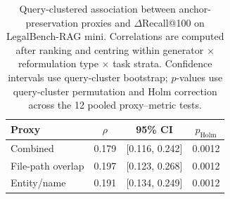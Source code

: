 \begin{table}[t]
\centering
\caption{Query-clustered association between anchor-preservation proxies
and $\Delta$Recall@100 on LegalBench-RAG mini. Correlations are computed
after ranking and centring within generator $\times$ reformulation type
$\times$ task strata. Confidence intervals use query-cluster bootstrap;
$p$-values use query-cluster permutation and Holm correction across the
12 pooled proxy--metric tests.}
\label{tab:anchor-proxy-correlation}
\begin{tabular}{lccc}
\toprule
Proxy & $\rho$ & 95\% CI & $p_{\mathrm{Holm}}$ \\
\midrule
Combined & 0.179 & [0.116, 0.242] & 0.0012 \\
File-path overlap & 0.197 & [0.123, 0.268] & 0.0012 \\
Entity/name & 0.191 & [0.134, 0.249] & 0.0012 \\
\bottomrule
\end{tabular}
\end{table}
